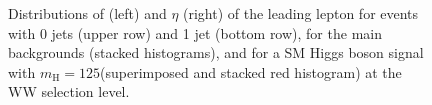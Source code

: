 \begin{figure}
{}
\caption{Distributions of \pt (left) and $\eta$ (right) of the leading lepton for events with 0 jets (upper row) and 1 jet (bottom row), for the main backgrounds (stacked histograms), and for a SM Higgs boson signal with $m_\mathrm{H}=125$\GeV (superimposed and stacked red histogram) at the WW selection level.}\label{fig:distr1}
\end{figure}

